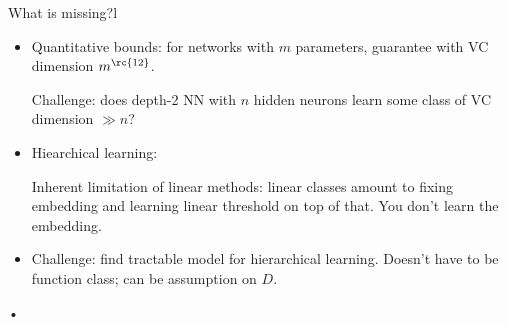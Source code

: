 What is missing?l
\begin{itemize}
\item
Quantitative bounds: for networks with $m$ parameters, guarantee with VC dimension $m^{\rc{12}}$. 

Challenge: does depth-2 NN with $n$ hidden neurons learn some class of VC dimension $\gg n$?
\item
Hiearchical learning:

Inherent limitation of linear methods: linear classes amount to fixing embedding and  learning linear threshold on top of that. You don't learn the embedding.
\item
Challenge: find tractable model for hierarchical learning. Doesn't have to be function class; can be assumption on $D$.
\end{itemize}•


\printbibliography
